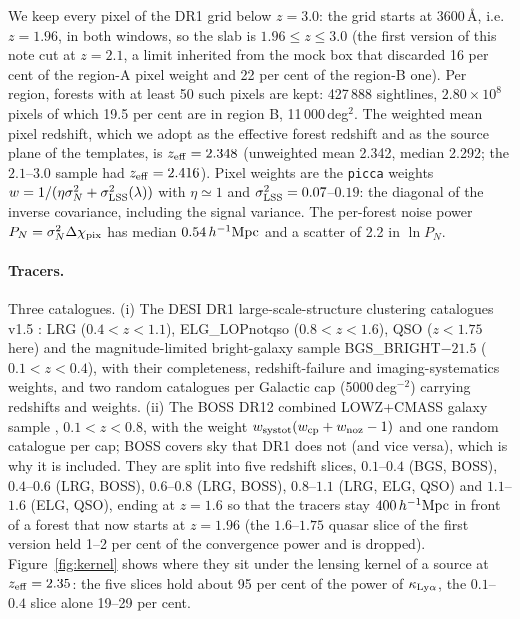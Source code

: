 \documentclass[11pt,a4paper]{article}
\newcommand{\kl}{\kappa_{{\rm Ly}\alpha}}
\newcommand{\Mpch}{\,h^{-1}{\rm Mpc}}
\begin{document}
We keep every pixel of the DR1 grid below $z=3.0$: the grid starts at 3600\,\AA, i.e.\ $z=1.96$, in both windows, so the slab is $1.96\le z\le3.0$ (the first version of this note cut at $z=2.1$, a limit inherited from the mock box that discarded 16 per cent of the region-A pixel weight and 22 per cent of the region-B one). Per region, forests with at least 50 such pixels are kept: 427\,888 sightlines, $2.80\times10^8$ pixels of which 19.5 per cent are in region B, 11\,000\,deg$^2$. The weighted mean pixel redshift, which we adopt as the effective forest redshift and as the source plane of the templates, is $z_{\rm eff}=2.348$ (unweighted mean 2.342, median 2.292; the $2.1$--$3.0$ sample had $z_{\rm eff}=2.416$). Pixel weights are the \texttt{picca} weights $w=1/(\eta\sigma_N^2+\sigma^2_{\rm LSS}(\lambda))$ with $\eta\simeq1$ and $\sigma^2_{\rm LSS}=0.07$--$0.19$: the diagonal of the inverse covariance, including the signal variance. The per-forest noise power $P_N=\sigma_N^2\Delta\chi_{\rm pix}$ has median $0.54\Mpch$ and a scatter of 2.2 in $\ln P_N$.

\paragraph{Tracers.} Three catalogues. (i) The DESI DR1 large-scale-structure clustering catalogues v1.5 \citep{2405.16593}: LRG ($0.4<z<1.1$), ELG\_LOPnotqso ($0.8<z<1.6$), QSO ($z<1.75$ here) and the magnitude-limited bright-galaxy sample BGS\_BRIGHT$-21.5$ ($0.1<z<0.4$), with their completeness, redshift-failure and imaging-systematics weights, and two random catalogues per Galactic cap (5000\,deg$^{-2}$) carrying redshifts and weights. (ii) The BOSS DR12 combined LOWZ+CMASS galaxy sample \citep[CMASSLOWZTOT;][]{2016MNRAS.455.1553R}, $0.1<z<0.8$, with the weight $w_{\rm systot}(w_{\rm cp}+w_{\rm noz}-1)$ and one random catalogue per cap; BOSS covers sky that DR1 does not (and vice versa), which is why it is included. They are split into five redshift slices, $0.1$--$0.4$ (BGS, BOSS), $0.4$--$0.6$ (LRG, BOSS), $0.6$--$0.8$ (LRG, BOSS), $0.8$--$1.1$ (LRG, ELG, QSO) and $1.1$--$1.6$ (ELG, QSO), ending at $z=1.6$ so that the tracers stay $400\Mpch$ in front of a forest that now starts at $z=1.96$ (the $1.6$--$1.75$ quasar slice of the first version held 1--2 per cent of the convergence power and is dropped). Figure~\ref{fig:kernel} shows where they sit under the lensing kernel of a source at $z_{\rm eff}=2.35$: the five slices hold about 95 per cent of the power of $\kl$, the $0.1$--$0.4$ slice alone 19--29 per cent.
\end{document}
